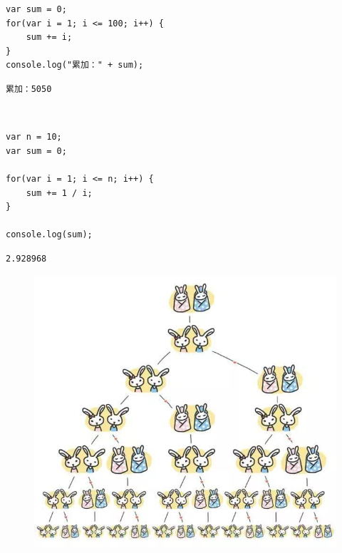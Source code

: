 \begin{lstlisting}[style=htmlcssjs]
var sum = 0;
for(var i = 1; i <= 100; i++) {
    sum += i;
}
console.log("累加：" + sum);
\end{lstlisting}

\begin{tcolorbox}
	\begin{verbatim}
累加：5050
	\end{verbatim}
\end{tcolorbox}

\vspace{0.5cm}

 \\

\begin{lstlisting}[style=htmlcssjs]
var n = 10;
var sum = 0;

for(var i = 1; i <= n; i++) {
    sum += 1 / i;
}

console.log(sum);
\end{lstlisting}

\begin{tcolorbox}
	\begin{verbatim}
2.928968
	\end{verbatim}
\end{tcolorbox}

\vspace{0.5cm}


\begin{figure}[H]
	\centering
	\includegraphics[scale=0.5]{img/C11/11-4/1.png}
\end{figure}

